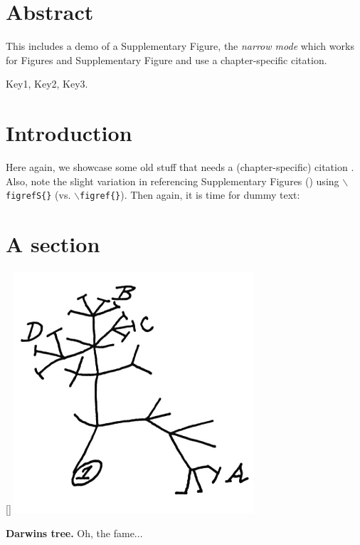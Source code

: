 \section*{Abstract}
This includes a demo of a Supplementary Figure, the \textit{narrow mode} which works for Figures and Supplementary Figure and use a chapter-specific citation.

 Key1, Key2, Key3.

\begin{multicols}{2}
\section{Introduction}
\noindent
Here again, we showcase some old stuff that needs a (chapter-specific) citation .
Also, note the slight variation in referencing Supplementary Figures () using \texttt{$\backslash$figrefS\{\}} (vs. \texttt{$\backslash$figref\{\}}).
Then again, it is time for dummy text: 

\section{A section}
\begin{supplFigure*}[!t]
[\FBwidth]
{\includegraphics[width = .5\fwidth]{figures/c1/tree.jpg}}
{\caption[Darwins tree]{\label{fig:c1s1}\textbf{Darwins tree.}
Oh, the fame...}}
\end{supplFigure*}

\lipsum[2-4]

\end{multicols}